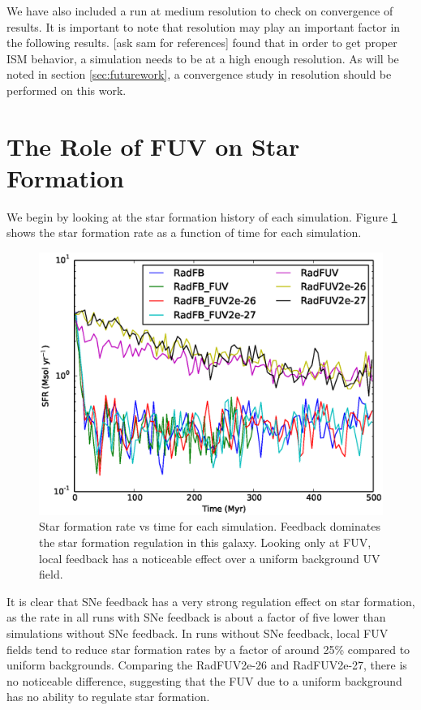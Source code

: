 We have also included a run at medium resolution to check on convergence of results. It is important to note that resolution may play an important factor in the following results. \citet{FILL IN} [ask sam for references] found that in order to get proper ISM behavior, a simulation needs to be at a high enough resolution. As will be noted in section \ref{sec:futurework}, a convergence study in resolution should be performed on this work.

\section{The Role of FUV on Star Formation}
\label{sec:fuvsfr}


We begin by looking at the star formation history of each simulation. Figure \ref{fig:sfrvtime} shows the star formation rate as a function of time for each simulation. 

\begin{figure}
\includegraphics[width=\textwidth]{graphics/sfrvtime.eps}
\caption[Star formation histories.]{Star formation rate vs time for each simulation. Feedback dominates the star formation regulation in this galaxy. Looking only at FUV, local feedback has a noticeable effect over a uniform background UV field.}
\label{fig:sfrvtime}
\end{figure}

It is clear that SNe feedback has a very strong regulation effect on star formation, as the rate in all runs with SNe feedback is about a factor of five lower than simulations without SNe feedback. In runs without SNe feedback, local FUV fields tend to reduce star formation rates by a factor of around 25\% compared to uniform backgrounds. Comparing the RadFUV2e-26 and RadFUV2e-27, there is no noticeable difference, suggesting that the FUV due to a uniform background has no ability to regulate star formation.

